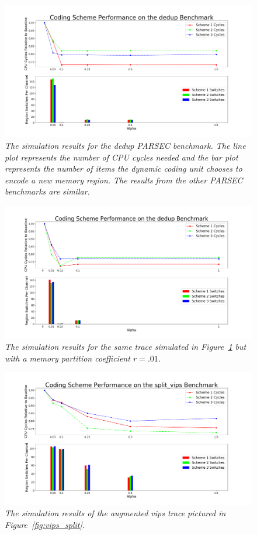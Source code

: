 \begin{figure}[htbp]
		\includegraphics[width=\linewidth]{fig/dedup_benchmark_results.png}
		\caption{\it{The simulation results for the dedup PARSEC benchmark. The line plot represents the number of CPU cycles needed and the bar plot represents the number of items the dynamic coding unit chooses to encode a new memory region. The results from the other PARSEC benchmarks are similar.}}
		\label{fig:dedup_results}
\end{figure}

\begin{figure}[htbp]
		\includegraphics[width=\linewidth]{fig/dedup_hundreth.png}
		\caption{\it{The simulation results for the same trace simulated in Figure~\ref{fig:dedup_results} but with a memory partition coefficient $r = .01$.}}
		\label{fig:dedup_hundreth}
\end{figure}

\begin{figure}[htbp]
		\includegraphics[width=\linewidth]{fig/vips_split_results.png}
		\caption{\it{The simulation results of the augmented vips trace pictured in Figure~\ref{fig:vips_split}.}}
		\label{fig:vips_split_result}
\end{figure}

